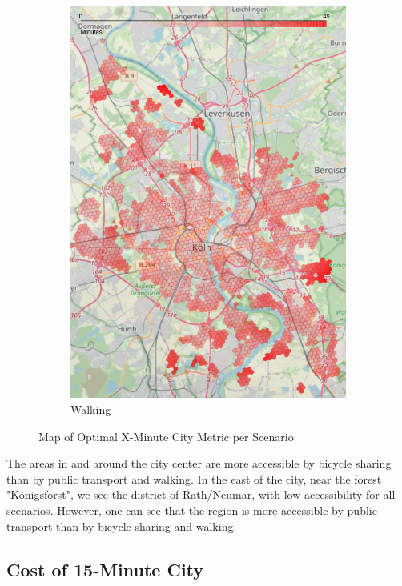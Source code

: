 \begin{figure}
\begin{subfigure}[b]{0.3\textwidth}
         \includegraphics[width=\textwidth]{Figures/results/minute_city_metric/walking_optimal_map}
         \caption{Walking}
         \label{fig:walking_optimal_map}
     \end{subfigure}
        \caption{Map of Optimal X-Minute City Metric per Scenario}
        \label{fig:optimal_map_per_scenario}
\end{figure}
The areas in and around the city center are more accessible by bicycle sharing than by public transport and walking.
In the east of the city, near the forest "Königsforst", we see the district of Rath/Neumar, with low accessibility for all scenarios.
However, one can see that the region is more accessible by public transport than by bicycle sharing and walking.

\subsection{Cost of 15-Minute City}
\label{subsec:cost_of_15_minute_city}


